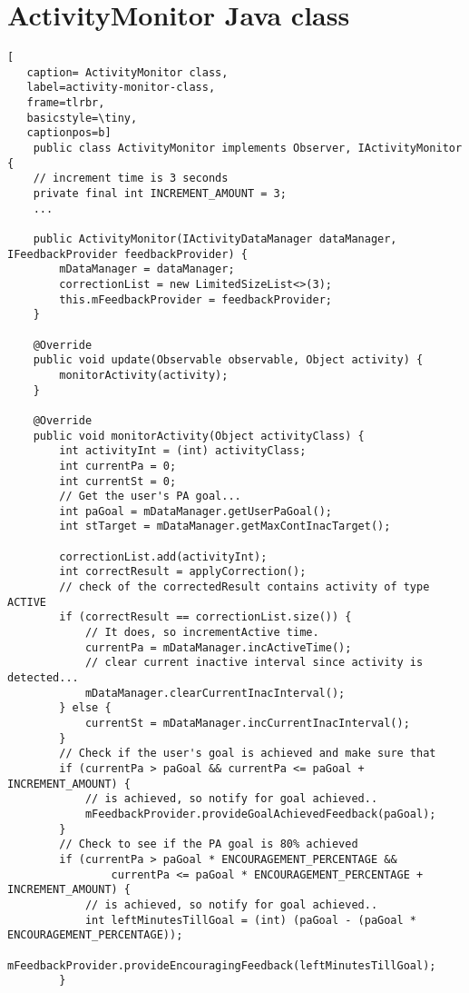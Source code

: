 \chapter{ActivityMonitor Java class}
\label{chapter:activity-monitor-class}

   \begin{lstlisting}[
   caption= ActivityMonitor class,
   label=activity-monitor-class,
   frame=tlrbr,
   basicstyle=\tiny,
   captionpos=b]
    public class ActivityMonitor implements Observer, IActivityMonitor {
    // increment time is 3 seconds
    private final int INCREMENT_AMOUNT = 3;
    ...

    public ActivityMonitor(IActivityDataManager dataManager, IFeedbackProvider feedbackProvider) {
        mDataManager = dataManager;
        correctionList = new LimitedSizeList<>(3);
        this.mFeedbackProvider = feedbackProvider;
    }

    @Override
    public void update(Observable observable, Object activity) {
        monitorActivity(activity);
    }

    @Override
    public void monitorActivity(Object activityClass) {
        int activityInt = (int) activityClass;
        int currentPa = 0;
        int currentSt = 0;
        // Get the user's PA goal...
        int paGoal = mDataManager.getUserPaGoal();
        int stTarget = mDataManager.getMaxContInacTarget();

        correctionList.add(activityInt);
        int correctResult = applyCorrection();
        // check of the correctedResult contains activity of type ACTIVE
        if (correctResult == correctionList.size()) {
            // It does, so incrementActive time.
            currentPa = mDataManager.incActiveTime();
            // clear current inactive interval since activity is detected...
            mDataManager.clearCurrentInacInterval();
        } else {
            currentSt = mDataManager.incCurrentInacInterval();
        }
        // Check if the user's goal is achieved and make sure that
        if (currentPa > paGoal && currentPa <= paGoal + INCREMENT_AMOUNT) {
            // is achieved, so notify for goal achieved..
            mFeedbackProvider.provideGoalAchievedFeedback(paGoal);
        }
        // Check to see if the PA goal is 80% achieved
        if (currentPa > paGoal * ENCOURAGEMENT_PERCENTAGE &&
                currentPa <= paGoal * ENCOURAGEMENT_PERCENTAGE + INCREMENT_AMOUNT) {
            // is achieved, so notify for goal achieved..
            int leftMinutesTillGoal = (int) (paGoal - (paGoal * ENCOURAGEMENT_PERCENTAGE));
            mFeedbackProvider.provideEncouragingFeedback(leftMinutesTillGoal);
        }


\end{lstlisting}
